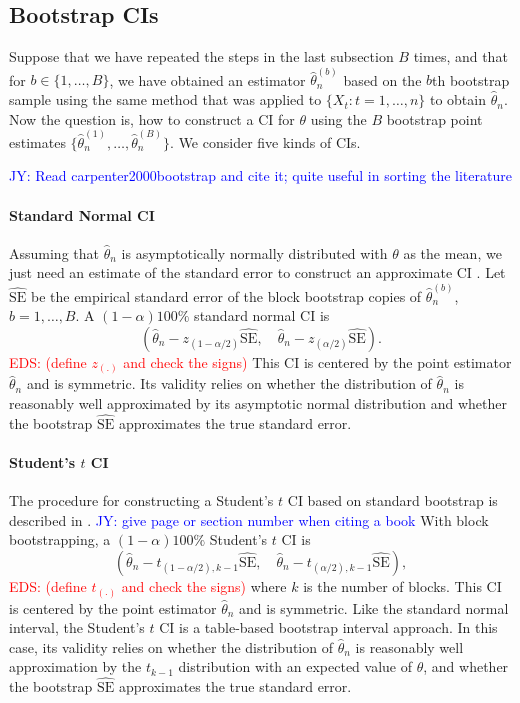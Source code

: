 \documentclass[12pt, letterpaper, titlepage]{article}
\newcommand{\jy}[1]{\textcolor{blue}{JY: #1}}
\newcommand{\eds}[1]{\textcolor{red}{EDS: (#1)}}
\begin{document}
\subsection{Bootstrap CIs}

Suppose that we have repeated the steps in the last subsection $B$ times, and
that for $b \in \{1, \ldots, B\}$, we have obtained an estimator
$\hat\theta_n^{(b)}$ based on the $b$th bootstrap sample using the same method
that was applied to $\{X_t: t = 1, \ldots, n\}$ to obtain $\hat\theta_n$.
Now the question is, how to construct a CI for $\theta$
using the $B$ bootstrap point estimates
$\{\hat\theta_n^{(1)}, \ldots, \hat\theta_n^{(B)}\}$.
We consider five kinds of CIs.

\jy{Read carpenter2000bootstrap and cite it; quite useful in sorting the literature}

\paragraph{Standard Normal CI}
Assuming that $\hat\theta_n$ is asymptotically normally distributed with
$\theta$ as the mean, we just need an estimate of the standard error to
construct an approximate CI \citep[p.168]{efron1993introduction}.
Let $\widehat{\text{SE}}$ be the empirical standard error of the block bootstrap
copies of $\hat\theta_n^{(b)}$, $b = 1, \ldots, B$.
A $(1 - \alpha)100\%$ standard normal CI is
\[
(\hat{\theta}_{n} - z_{(1-\alpha/2)}\widehat{\text{SE}}, \quad
\hat{\theta}_{n} - z_{(\alpha/2)}\widehat{\text{SE}}).
\]
\eds{define $z_{(.)}$ and check the signs}
This CI is centered by the point estimator $\hat\theta_n$ and is symmetric.
Its validity relies on whether the distribution of $\hat\theta_n$ is reasonably
well approximated by its asymptotic normal distribution and whether the
bootstrap $\widehat{\text{SE}}$ approximates the true standard error.

\paragraph{Student's $t$ CI}
The procedure for constructing a Student's $t$ CI based on standard bootstrap is
described in \citet{efron1993introduction}. \jy{give page or section number when
  citing a book}
With block bootstrapping, a $(1 - \alpha)100\%$ Student's $t$ CI is
\[
(\hat{\theta}_{n} - t_{(1-\alpha/2), k - 1}\hat{\text{SE}}, \quad
\hat{\theta}_{n} - t_{(\alpha/2), k -1}\hat{\text{SE}}),
\]
\eds{define $t_{(.)}$ and check the signs}
where $k$ is the number of blocks.
This CI is centered by the point estimator $\hat\theta_n$ and is symmetric.
Like the standard 
normal interval, the Student's $t$ CI is a table-based bootstrap interval
approach. In this case,
its validity relies on whether the distribution of $\hat\theta_n$ is
reasonably well approximation by the $t_{k-1}$ distribution with an
expected value of $\theta$, and whether the bootstrap 
$\widehat{\text{SE}}$ approximates the true standard error.
\end{document}
